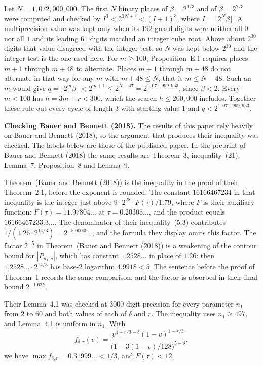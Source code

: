 \documentclass[11pt]{article}
\newcommand{\topic}[1]{\par\noindent\textbf{#1}}
\begin{document}
Let $N = 1{,}072{,}000{,}000$.
The first $N$ binary places of $\beta = 2^{1/3}$ and of $\beta = 2^{2/3}$ were computed and checked by $I^3 < 2^{3N+r} < (I+1)^3$, where $I = \lfloor 2^N \beta \rfloor$.
A multiprecision value was kept only when its $192$ guard digits were neither all $0$ nor all $1$ and its leading $61$ digits matched an integer cube root.
Above about $2^{30}$ digits that value disagreed with the integer test, so $N$ was kept below $2^{30}$ and the integer test is the one used here.
For $m \ge 100$, Proposition~E.1 requires places $m+1$ through $m+48$ to alternate.
Places $m+1$ through $m+48$ do not alternate in that way for any $m$ with $m + 48 \le N$, that is $m \le N - 48$.
Such an $m$ would give $q = \lfloor 2^m \beta \rfloor < 2^{m+1} \le 2^{N-47} = 2^{1{,}071{,}999{,}953}$, since $\beta < 2$.
Every $m < 100$ has $h = 3m + r < 300$, which the search $h \le 200{,}000$ includes.
Together these rule out every cycle of length $3$ with starting value $1$ and $q < 2^{1{,}071{,}999{,}953}$.

\topic{Checking Bauer and Bennett (2018).}
The results of this paper rely heavily on Bauer and Bennett (2018), so the argument that produces their inequality was checked.
The labels below are those of the published paper.
In the preprint of Bauer and Bennett (2018) the same results are Theorem~3, inequality~(21), Lemma~7, Proposition~8 and Lemma~9.

Theorem~(Bauer and Bennett (2018)) is the inequality in the proof of their Theorem~2.1, before the exponent is rounded.
The constant $16166467234$ in that inequality is the integer just above $9 \cdot 2^{28} \cdot F(\tau)/1.79$, where $F$ is their auxiliary function: $F(\tau) = 11.97804\ldots$ at $\tau = 0.20305\ldots$, and the product equals $16166467233.3\ldots$.
The denominator of their inequality~(5.3) contributes $1/(1.26 \cdot 2^{14/3}) = 2^{-5.00009\ldots}$, and the formula they display omits this factor.
The factor $2^{-5}$ in Theorem~(Bauer and Bennett (2018)) is a weakening of the contour bound for $|P_{n_1,\delta}|$, which has constant $1.2528\ldots$ in place of $1.26$: then $1.2528\ldots \cdot 2^{14/3}$ has base-$2$ logarithm $4.9918 < 5$.
The sentence before the proof of Theorem~1 records the same comparison, and the factor is absorbed in their final bound $2^{-1.62k}$.

Their Lemma~4.1 was checked at $3000$-digit precision for every parameter $n_1$ from $2$ to $60$ and both values of each of $\delta$ and $r$.
The inequality uses $n_1 \ge 497$, and Lemma~4.1 is uniform in $n_1$.
With
\[
f_{\delta,r}(v) = \frac{v^{4+r/3-\delta}(1-v)^{1-r/3}}{\bigl(1 - 3(1-v)/128\bigr)^{5-\delta}},
\]
we have $\max f_{\delta,r} = 0.31999\ldots < 1/3$, and $F(\tau) < 12$.
\end{document}
